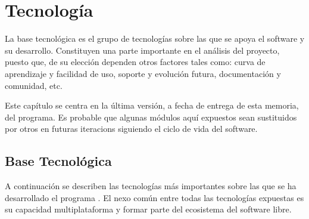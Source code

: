 \chapter[Tecnología]{
  \label{chp:tecnologia}
  Tecnología
}
\minitoc
\newpage

La base tecnológica es el grupo de tecnologías sobre las que se apoya el
software y su desarrollo. Constituyen una parte importante en el análisis
del proyecto, puesto que, de su elección dependen otros factores tales como:
curva de aprendizaje y facilidad de uso, soporte y evolución futura,
documentación y comunidad, etc.

Este capítulo se centra en la última versión, a fecha de entrega de esta memoria,
del programa. Es probable que algunas módulos aquí expuestos sean sustituidos
por otros en futuras \glspl{iteracion} siguiendo el ciclo de vida del software.


\section{Base Tecnológica}

A continuación se describen las tecnologías más importantes sobre las que
se ha desarrollado el programa \textbf{\software}. El nexo común entre todas las 
tecnologías expuestas es su capacidad multiplataforma y formar parte del ecosistema del
software libre.

